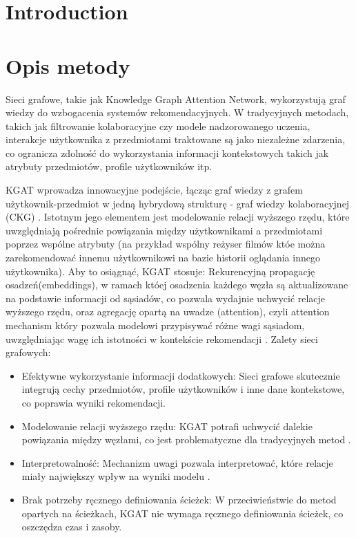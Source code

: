 \documentclass[a4paper,onecolumn]{LTJournalArticle}
\begin{document}
	\section{Introduction}
	\section{Opis metody}
	Sieci grafowe, takie jak Knowledge Graph Attention Network, wykorzystują graf wiedzy  do wzbogacenia systemów rekomendacyjnych. W tradycyjnych metodach, takich jak filtrowanie kolaboracyjne \cite{schafer2007collaborative}
	czy modele nadzorowanego uczenia, interakcje użytkownika z przedmiotami traktowane są jako niezależne zdarzenia, co ogranicza zdolność do wykorzystania informacji kontekstowych takich jak atrybuty przedmiotów, profile użytkowników itp.

KGAT wprowadza innowacyjne podejście, łącząc graf wiedzy z grafem użytkownik-przedmiot w jedną hybrydową strukturę - graf wiedzy kolaboracyjnej (CKG) \cite{zhang2016collaborative}. 
Istotnym jego elementem jest modelowanie relacji wyższego rzędu, które uwzględniają pośrednie powiązania między użytkownikami a przedmiotami poprzez wspólne atrybuty 
(na przykład wspólny reżyser filmów któe można zarekomendować innemu użytkownikowi na bazie historii oglądania innego użytkownika). 
Aby to osiągnąć, KGAT stosuje:
Rekurencyjną propagację osadzeń(embeddings), w ramach któej osadzenia każdego węzła są aktualizowane na podstawie informacji od sąsiadów, co pozwala wydajnie uchwycić relacje wyższego rzędu, oraz 
agregację opartą na uwadze (attention), czyli attention mechanism który pozwala modelowi przypisywać różne wagi sąsiadom, uwzględniając wagę ich istotności w kontekście rekomendacji \cite{vaswani2017attention}.
Zalety sieci grafowych:
\begin{itemize}
	\item Efektywne wykorzystanie informacji dodatkowych: Sieci grafowe skutecznie integrują cechy przedmiotów, profile użytkowników i inne dane kontekstowe, co poprawia wyniki rekomendacji.
\item Modelowanie relacji wyższego rzędu: KGAT potrafi uchwycić dalekie powiązania między węzłami, co jest problematyczne dla tradycyjnych metod  \cite{ying2018graph}.
\item Interpretowalność: Mechanizm uwagi pozwala interpretować, które relacje miały największy wpływ na wyniki modelu \cite{chen2017attentive}.
\item Brak potrzeby ręcznego definiowania ścieżek: W przeciwieństwie do metod opartych na ścieżkach, KGAT nie wymaga ręcznego definiowania ścieżek, co oszczędza czas i zasoby.
\end{itemize}
\end{document}
